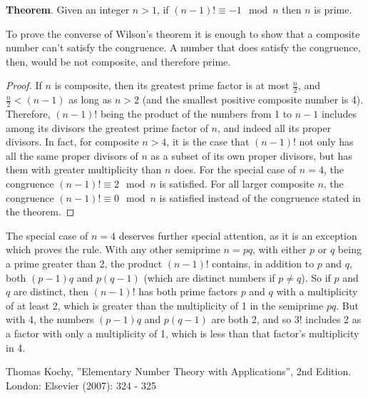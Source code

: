 \documentclass[12pt]{article}
\begin{document}
{\bf Theorem}. Given an integer $n > 1$, if $(n - 1)! \equiv -1 \mod n$ then $n$ is prime.

To prove the converse of Wilson's theorem it is enough to show that a composite number can't satisfy the congruence. A number that does satisfy the congruence, then, would be not composite, and therefore prime.

\begin{proof}
If $n$ is composite, then its greatest prime factor is at most $\displaystyle \frac{n}{2}$, and $\displaystyle \frac{n}{2} < (n - 1)$ as long as $n > 2$ (and the smallest positive composite number is 4). Therefore, $(n - 1)!$ being the product of the numbers from 1 to $n - 1$ includes among its divisors the greatest prime factor of $n$, and indeed all its proper divisors. In fact, for composite $n > 4$, it is the case that $(n - 1)!$ not only has all the same proper divisors of $n$ as a subset of its own proper divisors, but has them with greater multiplicity than $n$ does. For the special case of $n = 4$, the congruence $(n - 1)! \equiv 2 \mod n$ is satisfied. For all larger composite $n$, the congruence $(n - 1)! \equiv 0 \mod n$ is satisfied instead of the congruence stated in the theorem.
\end{proof}

The special case of $n = 4$ deserves further special attention, as it is an exception which proves the rule. With any other semiprime $n = pq$, with either $p$ or $q$ being a prime greater than 2, the product $(n - 1)!$ contains, in addition to $p$ and $q$, both $(p - 1)q$ and $p(q - 1)$ (which are distinct numbers if $p \neq q$). So if $p$ and $q$ are distinct, then $(n - 1)!$ has both prime factors $p$ and $q$ with a multiplicity of at least 2, which is greater than the multiplicity of 1 in the semiprime $pq$. But with 4, the numbers $(p - 1)q$ and $p(q - 1)$ are both 2, and so 3! includes 2 as a factor with only a multiplicity of 1, which is less than that factor's multiplicity in 4.

\begin{thebibliography}{1}
 Thomas Kochy, ''Elementary Number Theory with Applications'', 2nd Edition. London: Elsevier (2007): 324 - 325
\end{thebibliography}
\end{document}

